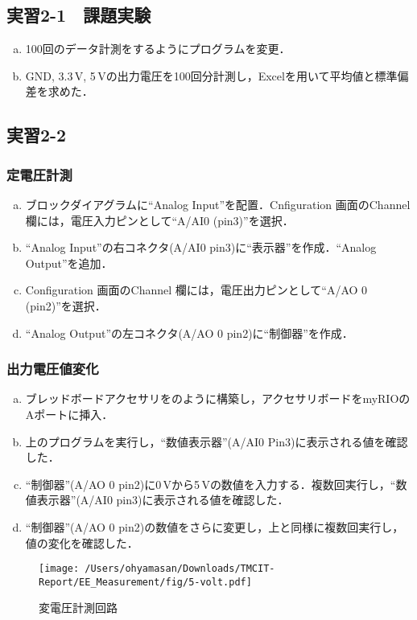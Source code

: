 \subsection{実習2-1　課題実験}
\begin{enumerate}[a)]
\item 100回のデータ計測をするようにプログラムを変更．
\item GND, 3.3\,\rm{V}, 5\,\rm{V}の出力電圧を100回分計測し，Excelを用いて平均値と標準偏差を求めた．
\end{enumerate}

\subsection{実習2-2}
\subsubsection{定電圧計測}
\begin{enumerate}[a)]
	\item ブロックダイアグラムに``Analog Input''を配置．Cnfiguration 画面のChannel 欄には，電圧入力ピンとして``A/AI0 (pin3)''を選択．
	\item``Analog Input''の右コネクタ(A/AI0 pin3)に``表示器''を作成．``Analog Output''を追加．
	\item Configuration 画面のChannel 欄には，電圧出力ピンとして``A/AO 0 (pin2)''を選択．
	\item ``Analog Output''の左コネクタ(A/AO 0 pin2)に``制御器''を作成．
\end{enumerate}

\subsubsection{出力電圧値変化}
\begin{enumerate}[a)]
	\item ブレッドボードアクセサリをのように構築し，アクセサリボードをmyRIOのAポートに挿入．
	\item 上のプログラムを実行し，``数値表示器''(A/AI0 Pin3)に表示される値を確認した．
	\item ``制御器''(A/AO 0 pin2)に0\,\rm{V}から5\,\rm{V}の数値を入力する．複数回実行し，``数値表示器''(A/AI0 pin3)に表示される値を確認した．
	\item ``制御器''(A/AO 0 pin2)の数値をさらに変更し，上と同様に複数回実行し，値の変化を確認した．
\end{enumerate}

\begin{figure}[htb]
\centering
\texttt{[image: /Users/ohyamasan/Downloads/TMCIT-Report/EE\_Measurement/fig/5-volt.pdf]}
\caption{変電圧計測回路}
\label{fig:5-volt}
\end{figure}


